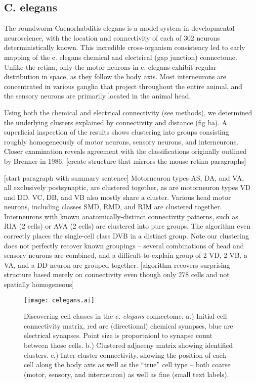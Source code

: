 \documentclass{article}
\begin{document}
\subsection{C. elegans}

The roundworm Caenorhabditis elegans is a model system in
developmental neuroscience, with the location and connectivity of each
of 302 neurons deterministically known. This incredible cross-organism
consistency led to early mapping of the c. elegans chemical and
electrical (gap junction) connectome. Unlike the retina, only the
motor neurons in c. elegans exhibit regular distribution in space, as
they follow the body axis. Most interneurons are concentrated in
various ganglia that project throughout the entire animal, and the
sensory neurons are primarily located in the animal head.

Using both the chemical and electrical connectivity (see methods), we
determined the underlying clusters explained by connectivity and
distance (fig ba). A superficial inspection of the results shows
clustering into groups consisting roughly homogeneously of motor
neurons, sensory neurons, and interneurons. Closer examination reveals
agreement with the classifications originally outlined by Brenner in
1986.  [create structure that mirrors the mouse retina paragraphs]

[start paragraph with summary sentence] Motorneuron types AS, DA, and
VA, all exclusively postsynaptic, are clustered together, as are
motorneuron types VD and DD. VC, DB, and VB also mostly share a
cluster. Various head motor neurons, including classes SMD, RMD, and
RIM are clustered together. Interneurons with known
anatomically-distinct connectivity patterns, such as RIA (2 cells) or
AVA (2 cells) are clustered into pure groups. The algorithm even
correctly places the single-cell class DVB in a distinct group. Note
our clustering does not perfectly recover known groupings -- several
combinations of head and sensory neurons are combined, and a
difficult-to-explain group of 2 VD, 2 VB, a VA, and a DD neuron are
grouped together. [algorithm recovers surprising structure based
merely on connectivity even though only 278 cells and not spatially
homogeneous]


\begin{figure}
  \centering 
  \centerline{\texttt{[image: celegans.ai]}}
  \caption{Discovering cell classes in the \textit{c. elegans} connectome. a.) Initial cell connectivity matrix, red are (directional) chemical synapses, blue are
electrical synapses. Point size is proportaionl to synapse count between those cells. b.) Clustered adjaceny matrix showing identified clusters. c.) Inter-cluster
connectivity, showing the position of each cell along the body axis as well
as the ``true'' cell type -- both coarse (motor, sensory, and interneuron) as well
as fine (small text labels). }
\end{figure}
\end{document}
